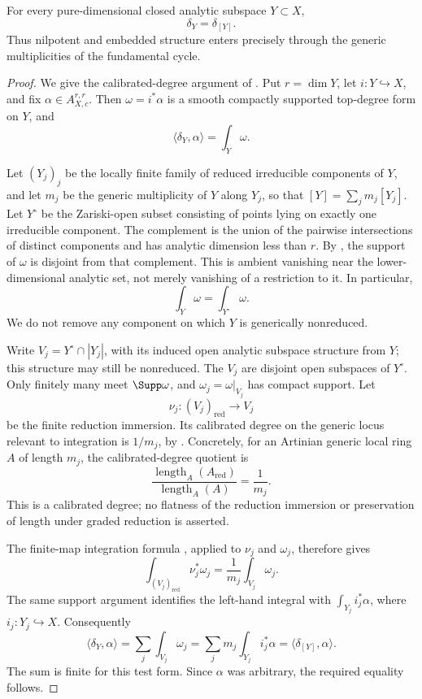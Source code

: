 \begin{theorem}
\label{thm:current-fundamental-cycle}
For every pure-dimensional closed analytic subspace $Y\subset X$,
\[
                         \delta_Y=\delta_{[Y]}.
\]
Thus nilpotent and embedded structure enters precisely through the generic
multiplicities of the fundamental cycle.
\end{theorem}
\begin{proof}
We give the calibrated-degree argument of
\cite[Proposition~16.6.3]{CLD25}.  Put $r=\dim Y$, let
$i:Y\hookrightarrow X$, and fix $\alpha\in A_{X,c}^{r,r}$.
Then $\omega=i^*\alpha$ is a smooth compactly supported top-degree
form on $Y$, and
\[
                         \langle\delta_Y,\alpha\rangle=\int_Y\omega.
\]

Let $(Y_j)_j$ be the locally finite family of reduced irreducible
components of $Y$, and let $m_j$ be the generic multiplicity of $Y$
along $Y_j$, so that $[Y]=\sum_jm_j[Y_j]$.
Let $Y^\circ$ be the Zariski-open subset consisting of points lying
on exactly one irreducible component.  The complement is the union
of the pairwise intersections of distinct components and has analytic
dimension less than $r$.  By
\cite[Proposition~15.2.1(b)]{CLD25}, the support of $\omega$ is
disjoint from that complement.  This is ambient vanishing near the
lower-dimensional analytic set, not merely vanishing of a restriction
to it.  In particular,
\[
                         \int_Y\omega=\int_{Y^\circ}\omega.
\]
We do not remove any component on which $Y$ is generically nonreduced.

Write $V_j=Y^\circ\cap |Y_j|$, with its induced open analytic subspace
structure from $Y$; this structure may still be nonreduced.
The $V_j$ are disjoint open subspaces of $Y^\circ$.
Only finitely many meet $\Supp\omega$, and $\omega_j=\omega|_{V_j}$
has compact support.  Let
\[
                       \nu_j:(V_j)_{\mathrm{red}}\longrightarrow V_j
\]
be the finite reduction immersion.  Its calibrated degree on the
generic locus relevant to integration is $1/m_j$, by
\cite[Proposition~13.3.7]{CLD25}.  Concretely, for an Artinian generic
local ring $A$ of length $m_j$, the calibrated-degree quotient is
\[
                  \frac{\operatorname{length}_A(A_{\mathrm{red}})}
                       {\operatorname{length}_A(A)}
                       =\frac{1}{m_j}.
\]
This is a calibrated degree; no flatness of the reduction immersion
or preservation of length under graded reduction is asserted.

The finite-map integration formula
\cite[Proposition~15.4.3]{CLD25}, applied to $\nu_j$ and $\omega_j$,
therefore gives
\[
             \int_{(V_j)_{\mathrm{red}}}\nu_j^*\omega_j
                          =\frac1{m_j}\int_{V_j}\omega_j.
\]
The same support argument identifies the left-hand integral with
$\int_{Y_j}i_j^*\alpha$, where $i_j:Y_j\hookrightarrow X$.
Consequently
\[
 \langle\delta_Y,\alpha\rangle
   =\sum_j\int_{V_j}\omega_j
   =\sum_jm_j\int_{Y_j}i_j^*\alpha
   =\langle\delta_{[Y]},\alpha\rangle.
\]
The sum is finite for this test form.  Since $\alpha$ was arbitrary,
the required equality follows.
\end{proof}
